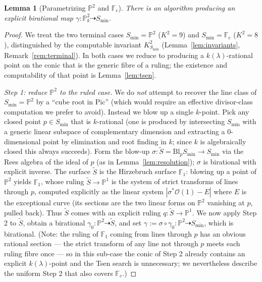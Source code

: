 \documentclass{amsart}
\theoremstyle{plain}
\newtheorem{lemma}{Lemma}
\theoremstyle{definition}
\newcommand{\PP}{\mathbb{P}}
\newcommand{\cO}{\mathcal{O}}
\begin{document}
\begin{lemma}[Parametrizing $\PP^2$ and $\mathbb F_e$]\label{lem:param-min}
There is an algorithm producing an explicit birational map
$\gamma\colon\PP^2_k\dashrightarrow S_{\min}$.
\end{lemma}

\begin{proof}
We treat the two terminal cases $S_{\min}=\PP^2$ ($K^2=9$) and
$S_{\min}=\mathbb F_e$ ($K^2=8$), distinguished by the computable invariant
$K_{S_{\min}}^2$ (Lemma~\ref{lem:invariants}, Remark~\ref{rem:terminal}).
In both cases we reduce to producing a $k(\lambda)$-rational point on the conic
that is the generic fibre of a ruling; the existence and computability of that
point is Lemma~\ref{lem:tsen}.

\medskip
\emph{Step 1: reduce $\PP^2$ to the ruled case.}
We do \emph{not} attempt to recover the line class of $S_{\min}=\PP^2$ by a
``cube root in $\mathrm{Pic}$'' (which would require an effective divisor-class
computation we prefer to avoid).  Instead we blow up a single $k$-point.  Pick
any closed point $p\in S_{\min}$ that is $k$-rational (one is produced by
intersecting $S_{\min}$ with a generic linear subspace of complementary
dimension and extracting a $0$-dimensional point by elimination and root finding
in $k$; since $k$ is algebraically closed this always succeeds).  Form the
blow-up $\sigma\colon \widetilde S=\mathrm{Bl}_p S_{\min}\to S_{\min}$ via the
Rees algebra of the ideal of $p$ (as in Lemma~\ref{lem:resolution}); $\sigma$ is
birational with explicit inverse.  The surface $\widetilde S$ is the Hirzebruch
surface $\mathbb F_1$: blowing up a point of $\PP^2$ yields $\mathbb F_1$, whose
ruling $\widetilde S\to\PP^1$ is the system of strict transforms of lines
through $p$, computed explicitly as the linear system $|\sigma^*\cO(1)-E|$ where
$E$ is the exceptional curve (its sections are the two linear forms on $\PP^2$
vanishing at $p$, pulled back).  Thus $\widetilde S$ comes with an explicit
ruling $q\colon\widetilde S\to\PP^1$.  We now apply Step 2 to $\widetilde S$,
obtain a birational $\gamma_0\colon\PP^2\dashrightarrow\widetilde S$, and set
$\gamma:=\sigma\circ\gamma_0\colon\PP^2\dashrightarrow S_{\min}$, which is
birational.  (Note: the ruling of $\mathbb F_1$ coming from lines through $p$ has
an obvious rational section --- the strict transform of any line not through $p$
meets each ruling fibre once --- so in this sub-case the conic of Step 2 already
contains an explicit $k(\lambda)$-point and the Tsen search is unnecessary; we
nevertheless describe the uniform Step 2 that also covers $\mathbb F_e$.)


\end{proof}
\end{document}
